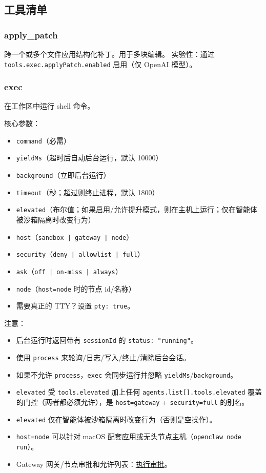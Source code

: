 \subsection{工具清单}


\subsubsection{apply\_patch}


跨一个或多个文件应用结构化补丁。用于多块编辑。
实验性：通过 \texttt{tools.exec.applyPatch.enabled} 启用（仅 OpenAI 模型）。

\subsubsection{exec}


在工作区中运行 shell 命令。

核心参数：

\begin{itemize}
  \item \texttt{command}（必需）
  \item \texttt{yieldMs}（超时后自动后台运行，默认 10000）
  \item \texttt{background}（立即后台运行）
  \item \texttt{timeout}（秒；超过则终止进程，默认 1800）
  \item \texttt{elevated}（布尔值；如果启用/允许提升模式，则在主机上运行；仅在智能体被沙箱隔离时改变行为）
  \item \texttt{host}（\texttt{sandbox | gateway | node}）
  \item \texttt{security}（\texttt{deny | allowlist | full}）
  \item \texttt{ask}（\texttt{off | on-miss | always}）
  \item \texttt{node}（\texttt{host=node} 时的节点 id/名称）
  \item 需要真正的 TTY？设置 \texttt{pty: true}。
\end{itemize}


注意：

\begin{itemize}
  \item 后台运行时返回带有 \texttt{sessionId} 的 \texttt{status: "running"}。
  \item 使用 \texttt{process} 来轮询/日志/写入/终止/清除后台会话。
  \item 如果不允许 \texttt{process}，\texttt{exec} 会同步运行并忽略 \texttt{yieldMs}/\texttt{background}。
  \item \texttt{elevated} 受 \texttt{tools.elevated} 加上任何 \texttt{agents.list[].tools.elevated} 覆盖的门控（两者都必须允许），是 \texttt{host=gateway} + \texttt{security=full} 的别名。
  \item \texttt{elevated} 仅在智能体被沙箱隔离时改变行为（否则是空操作）。
  \item \texttt{host=node} 可以针对 macOS 配套应用或无头节点主机（\texttt{openclaw node run}）。
  \item Gateway 网关/节点审批和允许列表：\href{/tools/exec-approvals}{执行审批}。
\end{itemize}


